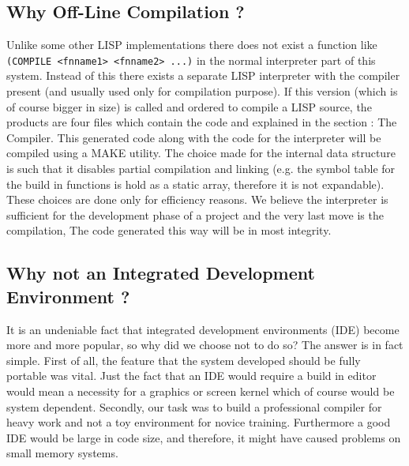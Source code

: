 \subsection{Why Off-Line Compilation ?}
Unlike some other LISP implementations there does not exist a function like
{\tt (COMPILE <fnname1> <fnname2> ...)} in the normal interpreter  part  of
this  system.  Instead of this there exists  a  separate  LISP  interpreter
with  the compiler present (and usually used only for compilation purpose).
If this version (which is of course bigger in size) is called  and  ordered
to compile a LISP source, the products are four files which contain the  \C
code  and  explained  in the section : The Compiler. This generated \C code
along with the \C code for the interpreter will be \C compiled using a MAKE
utility. The choice made for the internal data structure is  such  that  it
disables  partial  compilation  and  linking (e.g. the symbol table for the
build in functions  is  hold  as  a  static  array,  therefore  it  is  not
expandable). These choices are done only for efficiency reasons. We believe
the  interpreter  is  sufficient for the development phase of a project and
the very last move is the compilation, The code generated this way will  be
in most integrity.

\subsection{Why not an Integrated Development Environment ?}
It is an undeniable fact that  integrated  development  environments  (IDE)
become more and more popular, so why did we choose not to do so? The answer
is  in  fact  simple.  First  of all, the feature that the system developed
should be fully \C portable was vital. Just the fact  that  an  IDE  would
require  a  build in editor would mean a necessity for a graphics or screen
kernel which of course would be system dependent. Secondly, our task was to
build  a professional compiler for heavy work and not a toy environment for
novice training. Furthermore a good IDE would be large in  code  size,  and
therefore, it might have caused problems on small memory systems.


